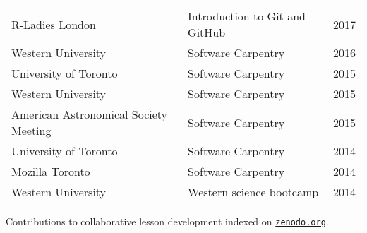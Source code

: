 \begin{tabularx}{\textwidth}{XXr}
R-Ladies London & Introduction to Git and GitHub & 2017\\
Western University& Software Carpentry & 2016\\
University of Toronto & Software Carpentry & 2015\\
Western University & Software Carpentry &2015\\ %
American Astronomical Society Meeting  & Software Carpentry & 2015\\
University of Toronto & Software Carpentry & 2014\\
Mozilla Toronto & Software Carpentry & 2014\\
Western University & Western science bootcamp & 2014\\
\end{tabularx}

\vspace{0.3cm}
Contributions to collaborative lesson development indexed on \href{https://zenodo.org/search?page=1&size=20&q=Barmby&type=lesson#}{\tt zenodo.org}.
